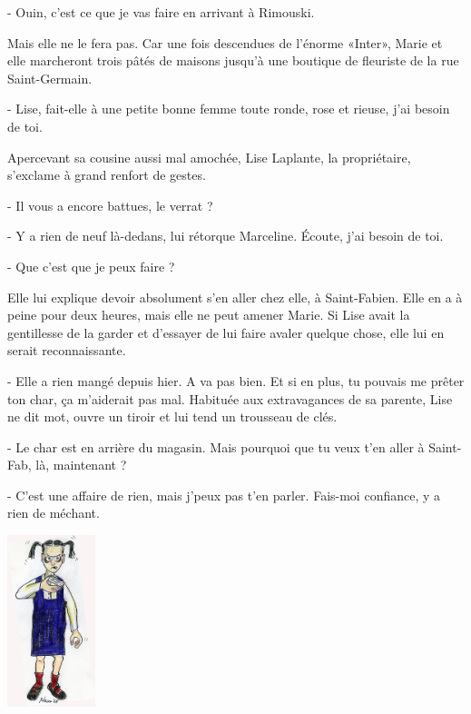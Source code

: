 - Ouin, c’est ce que je vas faire en arrivant à Rimouski.

Mais elle ne le fera pas. Car une fois descendues de l’énorme «Inter», Marie et elle marcheront trois pâtés de maisons jusqu’à une boutique de fleuriste de la rue Saint-Germain.

- Lise, fait-elle à une petite bonne femme toute ronde, rose et rieuse, j’ai besoin de toi.

Apercevant sa cousine aussi mal amochée, Lise Laplante, la propriétaire, s’exclame à grand renfort de gestes.

- Il vous a encore battues, le verrat ?

- Y a rien de neuf là-dedans, lui rétorque Marceline. Écoute, j’ai besoin de toi.

- Que c’est que je peux faire ?

Elle lui explique devoir absolument s’en aller chez elle, à Saint-Fabien. Elle en a à peine pour deux heures, mais elle ne peut amener Marie. Si Lise avait la gentillesse de la garder et d’essayer de lui faire avaler quelque chose, elle lui en serait reconnaissante.

- Elle a rien mangé depuis hier. A va pas bien. Et si en plus, tu pouvais me prêter ton char, ça m’aiderait pas mal.
Habituée aux extravagances de sa parente, Lise ne dit mot, ouvre un tiroir et lui tend un trousseau de clés.

- Le char est en arrière du magasin. Mais pourquoi que tu veux t’en aller à Saint-Fab, là, maintenant ?

- C’est une affaire de rien, mais j’peux pas t’en parler. Fais-moi confiance, y a rien de méchant.

\begin{floatingfigure}[l]{30mm}
\includegraphics[height=50mm]{corps/chapitre10/img/personnage-marie-jeune.jpg}
\end{floatingfigure}


